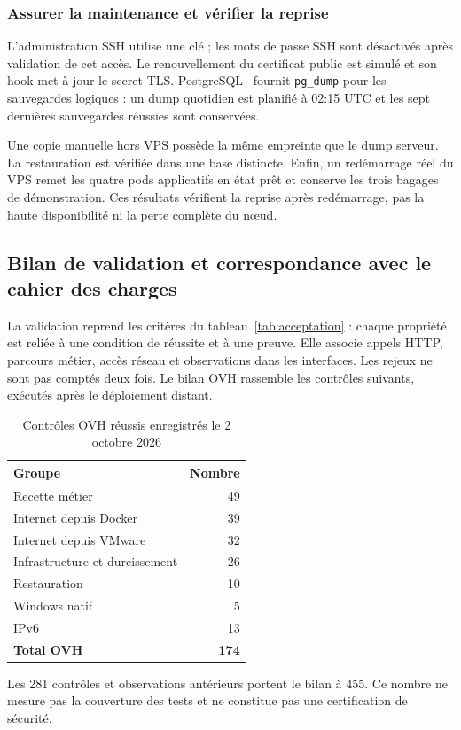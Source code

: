 \documentclass[11pt]{extarticle}
\begin{document}
\subsubsection{Assurer la maintenance et vérifier la reprise}

L’administration SSH utilise une clé ; les mots de passe SSH sont désactivés après validation de cet accès. Le renouvellement du certificat public est simulé et son hook met à jour le secret TLS. PostgreSQL~\cite{postgresql} fournit \texttt{pg\_dump} pour les sauvegardes logiques : un dump quotidien est planifié à 02:15 UTC et les sept dernières sauvegardes réussies sont conservées.

Une copie manuelle hors VPS possède la même empreinte que le dump serveur. La restauration est vérifiée dans une base distincte. Enfin, un redémarrage réel du VPS remet les quatre pods applicatifs en état prêt et conserve les trois bagages de démonstration. Ces résultats vérifient la reprise après redémarrage, pas la haute disponibilité ni la perte complète du nœud.

\FloatBarrier
\subsection{Bilan de validation et correspondance avec le cahier des charges}

La validation reprend les critères du tableau~\ref{tab:acceptation} : chaque propriété est reliée à une condition de réussite et à une preuve. Elle associe appels HTTP, parcours métier, accès réseau et observations dans les interfaces. Les rejeux ne sont pas comptés deux fois. Le bilan OVH rassemble les contrôles suivants, exécutés après le déploiement distant.

\begin{table}[htbp]\centering\caption{Contrôles OVH réussis enregistrés le 2 octobre 2026}
\begin{tabular}{lr}\toprule
\textbf{Groupe} & \textbf{Nombre}\\\midrule
Recette métier & 49\\
Internet depuis Docker & 39\\
Internet depuis VMware & 32\\
Infrastructure et durcissement & 26\\
Restauration & 10\\
Windows natif & 5\\
IPv6 & 13\\\midrule
\textbf{Total OVH} & \textbf{174}\\\bottomrule
\end{tabular}\end{table}
Les 281 contrôles et observations antérieurs portent le bilan à 455. Ce nombre ne mesure pas la couverture des tests et ne constitue pas une certification de sécurité.
\end{document}
